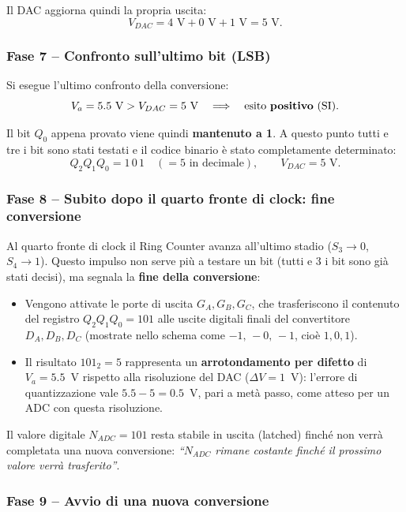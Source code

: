 \documentclass[11pt,a4paper]{report}
\begin{document}
Il DAC aggiorna quindi la propria uscita:
\[
V_{DAC} = 4\text{ V} + 0\text{ V} + 1\text{ V} = 5\text{ V}.
\]

\bigskip
\subsubsection{Fase 7 -- Confronto sull'ultimo bit (LSB)}

Si esegue l'ultimo confronto della conversione:
\[
V_a = 5.5\text{ V} > V_{DAC} = 5\text{ V} \quad\Longrightarrow\quad \text{esito \textbf{positivo} (SI)}.
\]

Il bit $Q_0$ appena provato viene quindi \textbf{mantenuto a 1}. A questo punto tutti e tre i bit sono stati testati e il codice binario è stato completamente determinato:
\[
Q_2 Q_1 Q_0 = 1\,0\,1 \quad (= 5 \text{ in decimale}), \qquad V_{DAC}=5\text{ V}.
\]

\bigskip
\subsubsection{Fase 8 -- Subito dopo il quarto fronte di clock: fine conversione}

Al quarto fronte di clock il Ring Counter avanza all'ultimo stadio ($S_3\to 0$, $S_4\to 1$). Questo impulso non serve pi\`u a testare un bit (tutti e 3 i bit sono gi\`a stati decisi), ma segnala la \textbf{fine della conversione}:

\begin{itemize}
    \item Vengono attivate le porte di uscita $G_A, G_B, G_C$, che trasferiscono il contenuto del registro $Q_2Q_1Q_0=101$ alle uscite digitali finali del convertitore $D_A, D_B, D_C$ (mostrate nello schema come $-1,\,-0,\,-1$, cio\`e $1,0,1$).
    \item Il risultato $101_2 = 5$ rappresenta un \textbf{arrotondamento per difetto} di $V_a=5.5$~V rispetto alla risoluzione del DAC ($\Delta V = 1$~V): l'errore di quantizzazione vale $5.5-5=0.5$~V, pari a met\`a passo, come atteso per un ADC con questa risoluzione.
\end{itemize}

Il valore digitale $N_{ADC}=101$ resta stabile in uscita (latched) finch\'e non verr\`a completata una nuova conversione: \emph{``$N_{ADC}$ rimane costante finch\'e il prossimo valore verr\`a trasferito''}.

\bigskip
\subsubsection{Fase 9 -- Avvio di una nuova conversione}
\end{document}
